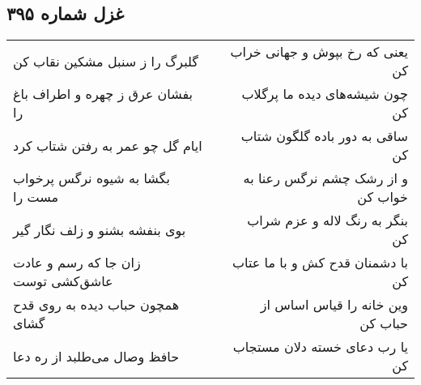 \begin{center}
\section*{غزل شماره ۳۹۵}
\label{sec:sh395}
\begin{longtable}{l p{0.5cm} r}
گلبرگ را ز سنبل مشکین نقاب کن
&&
یعنی که رخ بپوش و جهانی خراب کن
\\
بفشان عرق ز چهره و اطراف باغ را
&&
چون شیشه‌های دیده ما پرگلاب کن
\\
ایام گل چو عمر به رفتن شتاب کرد
&&
ساقی به دور باده گلگون شتاب کن
\\
بگشا به شیوه نرگس پرخواب مست را
&&
و از رشک چشم نرگس رعنا به خواب کن
\\
بوی بنفشه بشنو و زلف نگار گیر
&&
بنگر به رنگ لاله و عزم شراب کن
\\
زان جا که رسم و عادت عاشق‌کشی توست
&&
با دشمنان قدح کش و با ما عتاب کن
\\
همچون حباب دیده به روی قدح گشای
&&
وین خانه را قیاس اساس از حباب کن
\\
حافظ وصال می‌طلبد از ره دعا
&&
یا رب دعای خسته دلان مستجاب کن
\\
\end{longtable}
\end{center}
